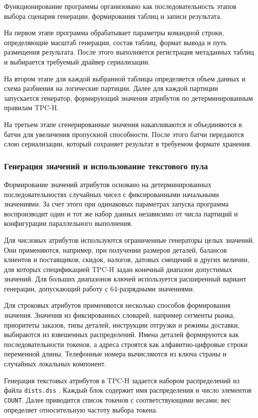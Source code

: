 Функционирование программы организовано как последовательность этапов выбора
сценария генерации, формирования таблиц и записи результата.

На первом этапе программа обрабатывает параметры командной строки, определяющие
масштаб генерации, состав таблиц, формат вывода и путь размещения результата.
После этого выполняется регистрация метаданных таблиц и выбирается требуемый
драйвер сериализации.

На втором этапе для каждой выбранной таблицы определяется объем данных и схема
разбиения на логические партиции. Далее для каждой партиции запускается
генератор, формирующий значения атрибутов по детерминированным правилам TPC-H.

На третьем этапе сгенерированные значения накапливаются и объединяются в батчи
для увеличения пропускной способности. После этого батчи передаются слою
сериализации, который сохраняет результат в требуемом формате хранения.

\subsubsection{Генерация значений и использование текстового пула}

Формирование значений атрибутов основано на детерминированных последовательностях
случайных чисел с фиксированными начальными значениями. За счет этого при
одинаковых параметрах запуска программа воспроизводит один и тот же набор
данных независимо от числа партиций и конфигурации параллельного выполнения.

Для числовых атрибутов используются ограниченные генераторы целых значений. Они
применяются, например, при получении размеров деталей, балансов клиентов и
поставщиков, скидок, налогов, датовых смещений и других величин, для которых
спецификацией TPC-H задан конечный диапазон допустимых значений. Для больших
диапазонов ключей используется расширенный вариант генерации, допускающий работу
с 64-разрядными значениями.

Для строковых атрибутов применяются несколько способов формирования значения.
Значения из фиксированных словарей, например сегменты рынка, приоритеты заказов,
типы деталей, инструкции отгрузки и режимы доставки, выбираются из взвешенных
распределений. Имена деталей формируются как последовательности токенов, а
адреса строятся как алфавитно-цифровые строки переменной длины. Телефонные
номера вычисляются из ключа страны и случайных локальных компонент.

Генерация текстовых атрибутов в TPC-H задается набором распределений из файла
\texttt{dists.dss} . Каждый блок содержит имя распределения и число
элементов \texttt{COUNT}. Далее приводится список токенов с соответствующими
весами; вес определяет относительную частоту выбора токена.

